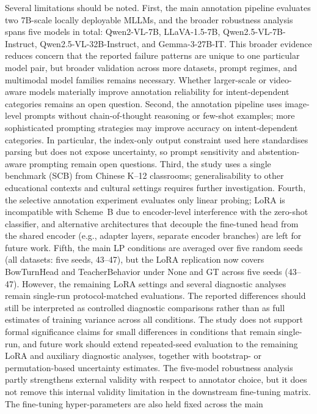 \documentclass{ieeeaccess}
\begin{document}
Several limitations should be noted.
First, the main annotation pipeline evaluates two 7B-scale locally
deployable MLLMs, and the broader robustness analysis spans five
models in total: Qwen2-VL-7B, LLaVA-1.5-7B,
Qwen2.5-VL-7B-Instruct, Qwen2.5-VL-32B-Instruct, and Gemma-3-27B-IT.
This broader evidence reduces concern that the reported failure
patterns are unique to one particular model pair, but broader
validation across more datasets, prompt regimes, and multimodal model
families remains necessary.
Whether larger-scale or video-aware models materially improve
annotation reliability for intent-dependent categories remains an open
question.
Second, the annotation pipeline uses image-level prompts without
chain-of-thought reasoning or few-shot examples; more sophisticated
prompting strategies may improve accuracy on intent-dependent
categories. In particular, the index-only output constraint used here
standardises parsing but does not expose uncertainty, so prompt
sensitivity and abstention-aware prompting remain open questions.
Third, the study uses a single benchmark
(SCB) from Chinese K--12 classrooms; generalisability to other
educational contexts and cultural settings requires further
investigation.
Fourth, the selective annotation experiment evaluates only linear
probing; LoRA is incompatible with Scheme~B due to encoder-level
interference with the zero-shot classifier, and alternative
architectures that decouple the fine-tuned head from the shared
encoder (e.g., adapter layers, separate encoder branches) are left
for future work.
Fifth, the main LP conditions are averaged over five random seeds
(all datasets: five seeds, 43--47), but the
LoRA replication now covers BowTurnHead and TeacherBehavior under None
and GT across five seeds (43--47). However, the remaining LoRA
settings and several diagnostic analyses remain single-run
protocol-matched evaluations. The reported differences
should still be interpreted as controlled diagnostic
comparisons rather than as full estimates of training variance across
all conditions.
The study does not support formal significance claims for
small differences in conditions that remain single-run, and future
work should extend repeated-seed evaluation to the remaining LoRA and
auxiliary diagnostic analyses, together with bootstrap- or
permutation-based uncertainty estimates.
The five-model robustness analysis partly strengthens external validity
with respect to annotator choice, but it does not remove this internal
validity limitation in the downstream fine-tuning matrix.
The fine-tuning hyper-parameters are also held fixed across the main
\end{document}
